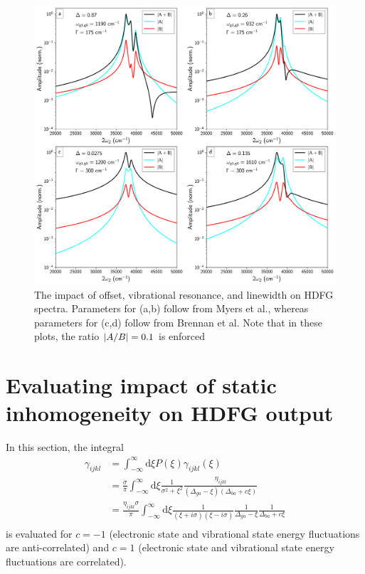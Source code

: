 \documentclass[aip, jcp, reprint, onecolumn, nofootinbib]{revtex4-2}
\begin{document}
\begin{figure}[!htbp]
	\centering
	\includegraphics[width=6.675in]{figures/changedelta.png}
	\caption{The impact of offset, vibrational resonance, and linewidth on HDFG spectra. Parameters for (a,b) follow from Myers et al., whereas parameters for (c,d) follow from Brennan et al.\cite{Myers1982, Brennan2024}
	Note that in these plots, the ratio $\abs{A/B} = 0.1$ is enforced} 
	\label{fig:chgdelta}
\end{figure}


\section{Evaluating impact of static inhomogeneity on HDFG output}
In this section, the integral
\begin{equation}\label{generalcontour}
	\begin{split}
		\gamma_{ijkl} &= \int_{-\infty}^\infty \mathrm{d}\xi P(\xi) \gamma_{ijkl}(\xi)\\
		&= \frac{\sigma}{\pi}\int_{-\infty}^\infty \mathrm{d}\xi \frac{1}{\sigma^2 + \xi^2} \frac{\eta_{ijkl}}{\left(\Delta_{ga} - \xi\right)\left(\Delta_{ba}+ c\xi\right)} \\
		&= \frac{\eta_{ijkl} \sigma}{\pi} \int_{-\infty}^\infty \mathrm{d}\xi\frac{1}{(\xi + i\sigma)(\xi - i\sigma)} \frac{1}{\Delta_{ga} - \xi} \frac{1}{\Delta_{ba} + c\xi}\\
	\end{split}
\end{equation}
is evaluated for $c=-1$ (electronic state and vibrational state energy fluctuations are anti-correlated) and $c=1$ (electronic state and vibrational state energy fluctuations are correlated).
\end{document}

